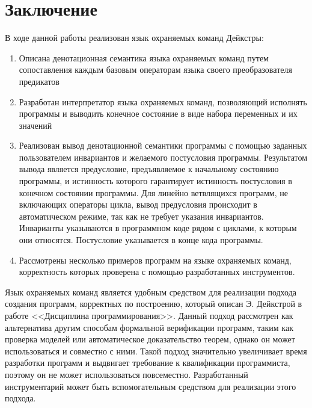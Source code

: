 \chapter*{Заключение} \label{ch-conclusion}

В ходе данной работы реализован язык охраняемых команд Дейкстры:
\begin{enumerate}
	\item Описана денотационная семантика языка охраняемых команд путем сопоставления каждым базовым операторам языка своего
	преобразователя предикатов
	\item Разработан интерпретатор языка охраняемых команд, позволяющий исполнять программы и выводить конечное состояние
	в виде набора переменных и их значений 
	\item Реализован вывод денотационной семантики программы с 
помощью заданных пользователем инвариантов и желаемого постусловия программы. Результатом вывода является предусловие, предъявляемое
к начальному состоянию программы, и истинность которого гарантирует истинность постусловия в конечном состоянии программы. Для линейно
ветвлящихся программ, не включающих операторы цикла, вывод предусловия происходит в автоматическом режиме, так как
не требует указания инвариантов. Инварианты указываются в программном коде рядом с циклами, к которым они относятся. Постусловие указывается
в конце кода программы.
	\item Рассмотрены несколько примеров программ на языке охраняемых команд, корректность которых проверена с помощью разработанных инструментов.
\end{enumerate}

Язык охраняемых команд является удобным средством для реализации подхода создания программ, корректных по построению,
который описан Э. Дейкстрой в работе <<Дисциплина программирования>>. Данный подход рассмотрен как альтернатива
другим способам формальной верификации программ, таким как проверка моделей или автоматическое доказательство теорем,
однако он может использоваться и совместно с ними. Такой подход значительно увеличивает время разработки программ
и выдвигает требование к квалификации программиста, поэтому он не может использоваться повсеместно. Разработанный 
инструментарий может быть вспомогательным средством для реализации этого подхода.




